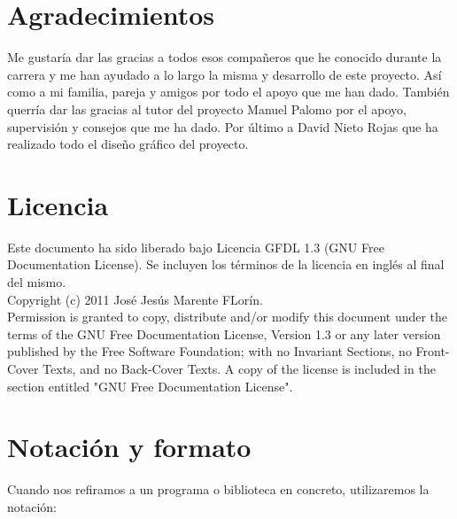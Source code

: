 

\section*{Agradecimientos}

Me gustaría dar las gracias a todos esos compañeros que he conocido durante la carrera y me han ayudado
a lo largo la misma y desarrollo de este proyecto. Así como a mi familia, pareja y amigos por todo el apoyo que me han dado. 
También querría dar las gracias al tutor del proyecto Manuel Palomo por el apoyo, supervisión y consejos que me ha dado. 
Por último a David Nieto Rojas que ha realizado todo el diseño gráfico del proyecto.

\cleardoublepage

\section*{Licencia} %

Este documento ha sido liberado bajo Licencia GFDL 1.3 (GNU Free
Documentation License). Se incluyen los términos de la licencia en
inglés al final del mismo.\\

Copyright (c) 2011 José Jesús Marente FLorín.\\

Permission is granted to copy, distribute and/or modify this document under the
terms of the GNU Free Documentation License, Version 1.3 or any later version
published by the Free Software Foundation; with no Invariant Sections, no
Front-Cover Texts, and no Back-Cover Texts. A copy of the license is included in
the section entitled "GNU Free Documentation License".\\

\cleardoublepage

\section*{Notación y formato}

Cuando nos refiramos a un programa o biblioteca en concreto, utilizaremos la
notación:\\

